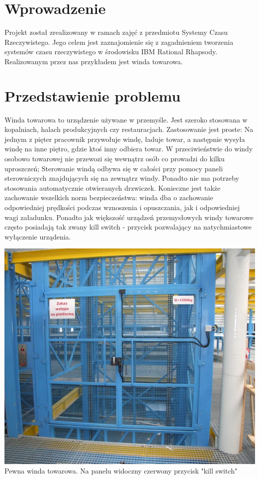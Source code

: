 \documentclass[a4paper,11pt]{article}
\begin{document}
\section{Wprowadzenie}
    Projekt został zrealizowany w ramach zajęć z przedmiotu Systemy Czasu Rzeczywistego.
    Jego celem jest zaznajomienie się z zagadnieniem tworzenia systemów czasu rzeczywistego w środowisku IBM Rational Rhapsody.
    Realizowanym przez nas przykładem jest winda towarowa. 


\section{Przedstawienie problemu}

    Winda towarowa to urządzenie używane w przemyśle. 
    Jest szeroko stosowana w kopalniach, halach produkcyjnych czy restauracjach.
    Zastosowanie jest proste: Na jednym z pięter pracownik
    przywołuje windę, ładuje towar, a następnie wysyła windę na inne piętro, gdzie ktoś inny odbiera towar.
    W przeciwieństwie do windy osobowo towarowej nie przewozi się wewnątrz osób co prowadzi do kilku uproszczeń;
    Sterowanie windą odbywa się w całości przy pomocy paneli sterowniczych znajdujących się na zewnątrz windy. 
    Ponadto nie ma potrzeby stosowania automatycznie otwieranych drzwiczek. 
    Konieczne jest także zachowanie wszelkich norm bezpieczeństwa: winda dba o zachowanie odpowiedniej prędkości podczas wznoszenia i opuszczania,  jak i odpowiedniej wagi załadunku.
    Ponadto jak większość urządzeń przemysłowych 
    windy towarowe często posiadają tak zwany kill switch - przycisk pozwalający na natychmiastowe wyłączenie urządenia. 
   
    \begin{center} 
    	\includegraphics{images/elevator.png} \\Pewna winda towarowa. Na panelu widoczny czerwony przycisk "kill switch"\\ 
    \end{center} 
    
\end{document}
